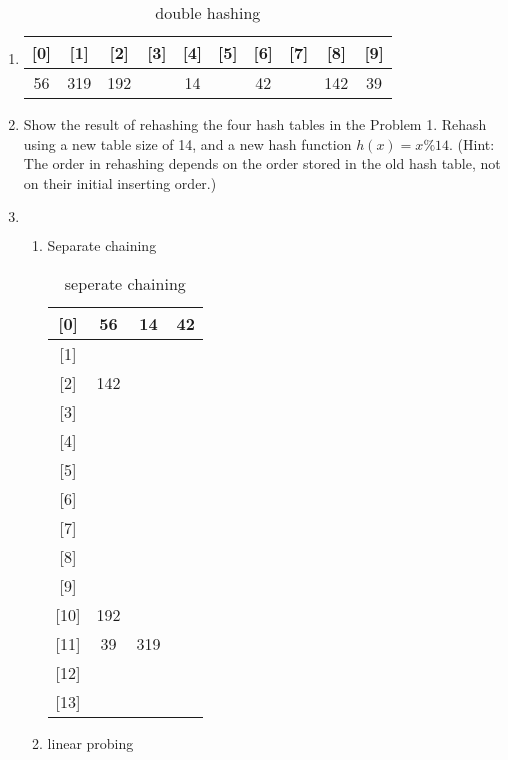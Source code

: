 \documentclass[12pt,a4paper]{article}
\makeatletter
\newtheorem*{solution}{Solution}
\theoremstyle{definition}
\renewenvironment{solution}[1][Solution] {\par\pushQED{\qed}\normalfont\topsep6\p@\@plus6\p@\relax\trivlist\item[\hskip\labelsep\bfseries#1\@addpunct{.}]\ignorespaces}{\popQED\endtrivlist\@endpefalse} \makeatother
\makeatother
\begin{document}
\begin{enumerate}
\begin{solution}
\begin{enumerate}
\begin{table}[h]
\begin{tabular}{|c|c|c|c|c|c|c|c|c|c|}
			\hline
			{[}0{]} & {[}1{]} & {[}2{]} & {[}3{]} & {[}4{]} & {[}5{]} & {[}6{]} & {[}7{]} & {[}8{]} & {[}9{]} \\ \hline
			56      & 319     & 192     &         & 14      &         & 42      &         & 142     & 39      \\ \hline
			\end{tabular}
			\caption{double hashing}
			\label{dh}
			\end{table}
	\end{enumerate}
\end{solution}
\item	 Show the result of rehashing the four hash tables in the Problem 1. Rehash
using a new table size of 14, and a new hash function $h(x) = x\%14$. {\color{blue}(Hint: The order
in rehashing depends on the order stored in the old hash table, not on their initial
inserting order.)}
\begin{solution}
	$\ $  \\
	\begin{enumerate}
		\item Separate chaining
			\begin{table}[h]
			\centering
			\begin{tabular}{|c|ccc|}
			\hline
			{[}0{]}  & 56  & 14  & 42 \\ \hline
			{[}1{]}  &     &     &    \\ \hline
			{[}2{]}  & 142 &     &    \\ \hline
			{[}3{]}  &     &     &    \\ \hline
			{[}4{]}  &     &     &    \\ \hline
			{[}5{]}  &     &     &    \\ \hline
			{[}6{]}  &     &     &    \\ \hline
			{[}7{]}  &     &     &    \\ \hline
			{[}8{]}  &     &     &    \\ \hline
			{[}9{]}  &     &     &    \\ \hline
			{[}10{]} & 192 &     &    \\ \hline
			{[}11{]} & 39  & 319 &    \\ \hline
			{[}12{]} &     &     &    \\ \hline
			{[}13{]} &     &     &    \\ \hline
			\end{tabular}
			\caption{seperate chaining}
			\label{sc14}
			\end{table}
		\item linear probing

\end{enumerate}
\end{solution}
\end{enumerate}
\end{document}
